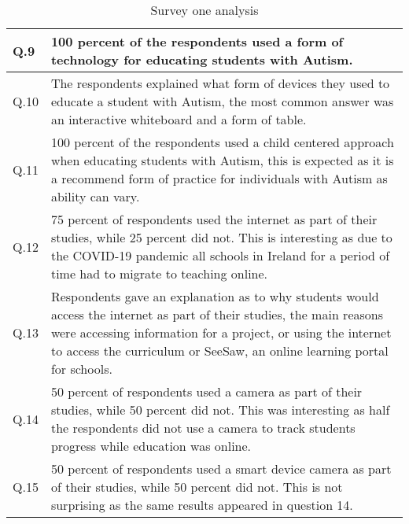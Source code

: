 \begin{table} [b]
\begin{tabular}{ | m{3em} | m{10cm}| }
\hline
Q.9 & 100 percent of the respondents used a form of technology for educating students with Autism. \\ 
\hline
Q.10 & The respondents explained what form of devices they used to educate a student with Autism, the most common answer was an interactive whiteboard and a form of table. \\ 
\hline
Q.11 & 100 percent of the respondents used a child centered approach when educating students with Autism, this is expected as it is a recommend form of practice for individuals with Autism as ability can vary. \\ 
\hline
Q.12 & 75 percent of respondents used the internet as part of their studies, while 25 percent did not. This is interesting as due to the COVID-19 pandemic all schools in Ireland for a period of time had to migrate to teaching online. \\ 
\hline

Q.13 & Respondents gave an explanation as to why students would access the internet as part of their studies, the main reasons were accessing information for a project, or using the internet to access the curriculum or SeeSaw, an online learning portal for schools.  \\
\hline
Q.14 & 50 percent of respondents used a camera as part of their studies, while 50 percent did not. This was interesting as half the respondents did not use a camera to track students progress while education was online.  \\
\hline
Q.15 & 50 percent of respondents used a smart device camera as part of their studies, while 50 percent did not. This is not surprising as the same results appeared in question 14.  \\
\hline
\end{tabular}
\centering

\caption{Survey one analysis}
    \label{tab:my_label}
\end{table}


